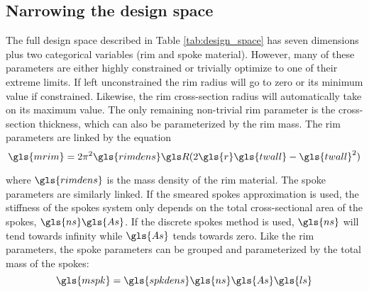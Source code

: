 \documentclass[\rootdir/thesis.tex]{subfiles}
\begin{document}
\subsection{Narrowing the design space}

The full design space described in Table \ref{tab:design_space} has seven dimensions plus two categorical variables (rim and spoke material). However, many of these parameters are either highly constrained or trivially optimize to one of their extreme limits. If left unconstrained the rim radius will go to zero or its minimum value if constrained. Likewise, the rim cross-section radius will automatically take on its maximum value. The only remaining non-trivial rim parameter is the cross-section thickness, which can also be parameterized by the rim mass. The rim parameters are linked by the equation
\begin{equation}
\label{eq:m_rim}
\gls{mrim} = 2\pi^2 \gls{rimdens} \R (2\gls{r}\gls{twall} - \gls{twall}^2)
\end{equation}

where $\gls{rimdens}$ is the mass density of the rim material. The spoke parameters are similarly linked. If the smeared spokes approximation is used, the stiffness of the spokes system only depends on the total cross-sectional area of the spokes, $\gls{ns}\gls{As}$. If the discrete spokes method is used, $\gls{ns}$ will tend towards infinity while $\gls{As}$ tends towards zero. Like the rim parameters, the spoke parameters can be grouped and parameterized by the total mass of the spokes:
\begin{equation}
\label{eq:m_spokes}
\gls{mspk} = \gls{spkdens} \gls{ns} \gls{As} \gls{ls}
\end{equation}
\end{document}
